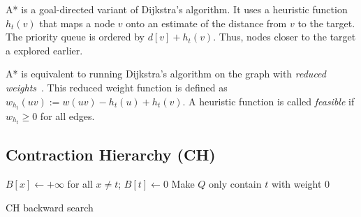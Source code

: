 \documentclass[manuscript,review]{acmart}
\begin{document}
A* is a goal-directed variant of Dijkstra's algorithm.
It uses a heuristic function $h_t(v)$ that maps a node $v$ onto an estimate of the distance from $v$ to the target.
The priority queue is ordered by $d[v] + h_t(v)$.
Thus, nodes closer to the target a explored earlier.

A* is equivalent to running Dijkstra's algorithm on the graph with \emph{reduced weights}~\cite{hnr-afbhd-68}.
This reduced weight function is defined as $w_{h_t}(uv) := w(uv) - h_t(u) + h_t(v)$.
A heuristic function is called \emph{feasible} if $w_{h_t} \geq 0$ for all edges.

\subsection{Contraction Hierarchy (CH)}

\begin{algorithm2e}
$B[x] \leftarrow +\infty$ for all $x\neq t$;
$B[t] \leftarrow 0$\;
Make $Q$ only contain $t$ with weight $0$\;
\caption{CH backward search}
\label{algo:ch-backward}
\end{algorithm2e}
\end{document}
